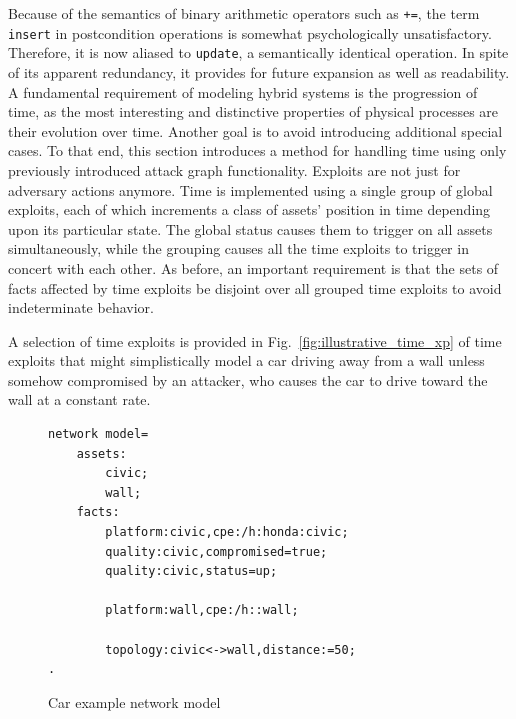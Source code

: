 Because of the semantics of binary arithmetic operators such as \texttt{+=},
the term \texttt{insert} in postcondition operations is somewhat psychologically
unsatisfactory. Therefore, it is now aliased to \texttt{update}, a semantically
identical operation. In spite of its apparent redundancy, it provides for
future expansion as well as readability.
A fundamental requirement of modeling hybrid systems is the progression of
time, as the most interesting and distinctive properties of physical processes
are their evolution over time. Another goal is to avoid introducing additional
special cases. To that end, this section introduces a method for handling time
using only previously introduced attack graph functionality.
Exploits are not just for adversary actions anymore. Time is implemented using
a single group of global exploits, each of which increments a class of assets'
position in time depending upon its particular state. The global status
causes them to trigger on all assets simultaneously, while the grouping causes
all the time exploits to trigger in concert with each other. As before,
an important requirement is that the sets of facts affected by time exploits
be disjoint over all grouped time exploits to avoid indeterminate behavior.

A selection of time exploits is provided in Fig.~\ref{fig:illustrative_time_xp}
of time exploits that might simplistically model
a car driving away from a wall unless somehow compromised by an attacker,
who causes the car to drive toward the wall at a constant rate.

\begin{figure}
\begin{lstlisting}
network model=
    assets:
        civic;
        wall;
    facts:
        platform:civic,cpe:/h:honda:civic;
        quality:civic,compromised=true;
        quality:civic,status=up;

        platform:wall,cpe:/h::wall;

        topology:civic<->wall,distance:=50;
.
\end{lstlisting}
\caption{Car example network model}
\label{fig:illustrative_time_nm}
\end{figure}

